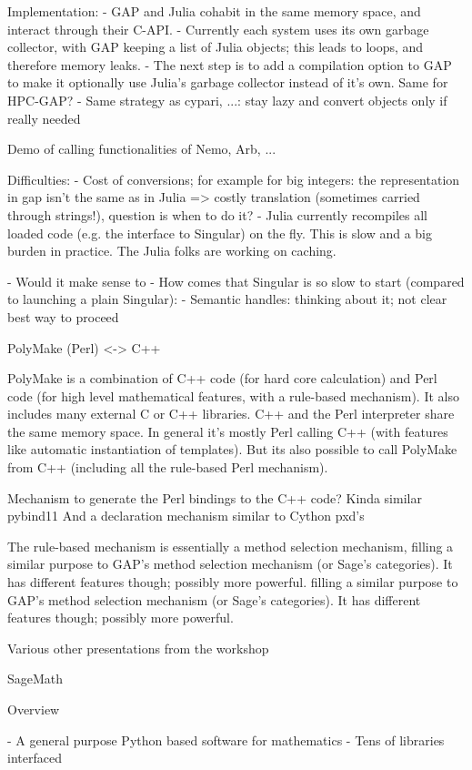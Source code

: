 Implementation:
- GAP and Julia cohabit in the same memory space, and interact through their C-API.
- Currently each system uses its own garbage collector, with GAP keeping a list
  of Julia objects; this leads to loops, and therefore memory leaks.
- The next step is to add a compilation option to GAP to make it optionally use
  Julia's garbage collector instead of it's own. Same for HPC-GAP?
- Same strategy as cypari, ...: stay lazy and convert objects only if really needed

Demo of calling functionalities of Nemo, Arb, ...

Difficulties:
- Cost of conversions; for example for big integers: the representation in gap isn't the same as in Julia => costly translation (sometimes carried through strings!), question is when to do it?
- Julia currently recompiles all loaded code (e.g. the interface to Singular) on the fly. This is slow and a big
  burden in practice. The Julia folks are working on caching.

- Would it make sense to 
- How comes that Singular is so slow to start (compared to launching a plain Singular):
- Semantic handles: thinking about it; not clear best way to proceed

 PolyMake (Perl) <-> C++

PolyMake is a combination of C++ code (for hard core calculation) and Perl code
(for high level mathematical features, with a rule-based mechanism).
It also includes many external C or C++ libraries.
C++ and the Perl interpreter share the same memory space. In general it's mostly Perl
calling C++ (with features like automatic instantiation of templates). But its also possible
to call PolyMake from C++ (including all the rule-based Perl mechanism).

Mechanism to generate the Perl bindings to the C++ code? Kinda similar pybind11
And a declaration mechanism similar to Cython pxd's

The rule-based mechanism is essentially a method selection mechanism,
filling a similar purpose to GAP's method selection mechanism (or Sage's categories).
It has different features though; possibly more powerful.
filling a similar purpose to GAP's method selection mechanism (or Sage's categories).
It has different features though; possibly more powerful.


Various other presentations from the workshop

 SageMath

 Overview

- A general purpose Python based software for mathematics
- Tens of libraries interfaced

